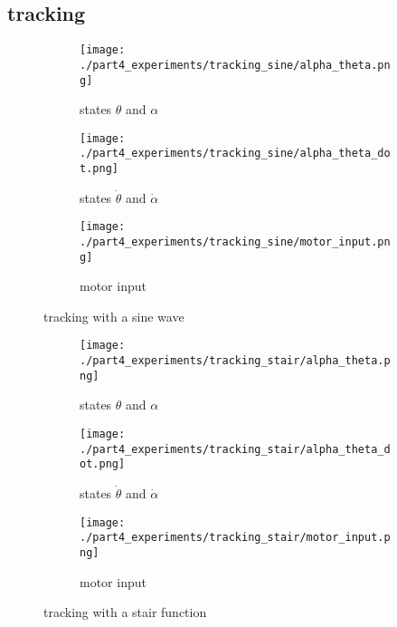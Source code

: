 \subsection{tracking}
	\begin{figure}[H]
		\centering
		\begin{subfigure}[b]{0.45\textwidth}
			\texttt{[image: ./part4\_experiments/tracking\_sine/alpha\_theta.png]}
			\caption{states $\theta$ and $\alpha$}
		\end{subfigure}
		\begin{subfigure}[b]{0.45\textwidth}
			\texttt{[image: ./part4\_experiments/tracking\_sine/alpha\_theta\_dot.png]}
			\caption{states $\dot{\theta}$ and $\dot{\alpha}$}
		\end{subfigure}
		\begin{subfigure}[b]{0.45\textwidth}
			\texttt{[image: ./part4\_experiments/tracking\_sine/motor\_input.png]}
			\caption{motor input}
		\end{subfigure}
		\caption{tracking with a sine wave}
	\end{figure}

	\begin{figure}[H]
		\centering
		\begin{subfigure}[b]{0.45\textwidth}
			\texttt{[image: ./part4\_experiments/tracking\_stair/alpha\_theta.png]}
			\caption{states $\theta$ and $\alpha$}
		\end{subfigure}
		\begin{subfigure}[b]{0.45\textwidth}
			\texttt{[image: ./part4\_experiments/tracking\_stair/alpha\_theta\_dot.png]}
			\caption{states $\dot{\theta}$ and $\dot{\alpha}$}
		\end{subfigure}
		\begin{subfigure}[b]{0.45\textwidth}
			\texttt{[image: ./part4\_experiments/tracking\_stair/motor\_input.png]}
			\caption{motor input}
		\end{subfigure}
		\caption{tracking with a stair function}
	\end{figure}

